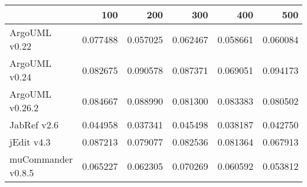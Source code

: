 \begin{tabular}{lrrrrr}
\toprule
{} &       100 &       200 &       300 &       400 &       500 \\
\midrule
ArgoUML v0.22      &  0.077488 &  0.057025 &  0.062467 &  0.058661 &  0.060084 \\
ArgoUML v0.24      &  0.082675 &  0.090578 &  0.087371 &  0.069051 &  0.094173 \\
ArgoUML v0.26.2    &  0.084667 &  0.088990 &  0.081300 &  0.083383 &  0.080502 \\
JabRef v2.6        &  0.044958 &  0.037341 &  0.045498 &  0.038187 &  0.042750 \\
jEdit v4.3         &  0.087213 &  0.079077 &  0.082536 &  0.081364 &  0.067913 \\
muCommander v0.8.5 &  0.065227 &  0.062305 &  0.070269 &  0.060592 &  0.053812 \\
\bottomrule
\end{tabular}
